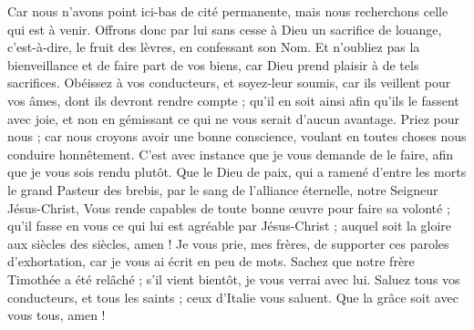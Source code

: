 \begin{multicols}{2}
Car nous n'avons point ici-bas de cité permanente, mais nous recherchons celle qui est à venir.
Offrons donc par lui sans cesse à Dieu un sacrifice de louange, c'est-à-dire, le fruit des lèvres, en confessant son Nom.
Et n'oubliez pas la bienveillance et de faire part de vos biens, car Dieu prend plaisir à de tels sacrifices.
Obéissez à vos conducteurs, et soyez-leur soumis, car ils veillent pour vos âmes, dont ils devront rendre compte ; qu’il en soit ainsi afin qu’ils le fassent avec joie, et non en gémissant ce qui ne vous serait d’aucun avantage.
Priez pour nous ; car nous croyons avoir une bonne conscience, voulant en toutes choses nous conduire honnêtement.
C’est avec instance que je vous demande de le faire, afin que je vous sois rendu plutôt.
Que le Dieu de paix, qui a ramené d'entre les morts le grand Pasteur des brebis, par le sang de l'alliance éternelle, notre Seigneur Jésus-Christ,
Vous rende capables de toute bonne œuvre pour faire sa volonté ; qu’il fasse en vous ce qui lui est agréable par Jésus-Christ ; auquel soit la gloire aux siècles des siècles, amen !
Je vous prie, mes frères, de supporter ces paroles d'exhortation, car je vous ai écrit en peu de mots.
Sachez que notre frère Timothée a été relâché ; s'il vient bientôt, je vous verrai avec lui.
Saluez tous vos conducteurs, et tous les saints ; ceux d'Italie vous saluent.
Que la grâce soit avec vous tous, amen !
\PPE{}
\end{multicols}
